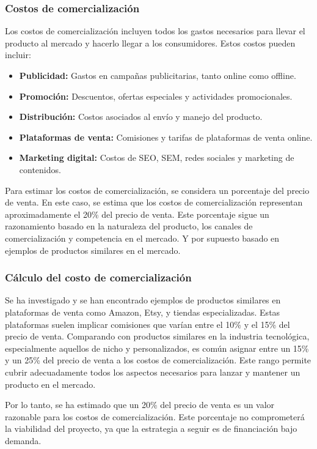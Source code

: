 \subsubsection{Costos de comercialización}

Los costos de comercialización incluyen todos los gastos necesarios para llevar el producto al mercado y hacerlo llegar a los consumidores. Estos costos pueden incluir:

\begin{itemize}
    \item \textbf{Publicidad:} Gastos en campañas publicitarias, tanto online como offline.
    \item \textbf{Promoción:} Descuentos, ofertas especiales y actividades promocionales.
    \item \textbf{Distribución:} Costos asociados al envío y manejo del producto.
    \item \textbf{Plataformas de venta:} Comisiones y tarifas de plataformas de venta online.
    \item \textbf{Marketing digital:} Costos de SEO, SEM, redes sociales y marketing de contenidos.
\end{itemize}

Para estimar los costos de comercialización, se considera un porcentaje del precio de venta. En este caso, se estima que los costos de comercialización representan aproximadamente el 20\% del precio de venta. Este porcentaje sigue un razonamiento basado en la naturaleza del producto, los canales de comercialización y competencia en el mercado. Y por supuesto basado en ejemplos de productos similares en el mercado.

\subsubsection{Cálculo del costo de comercialización}
Se ha investigado y se han encontrado ejemplos de productos similares en plataformas de venta como Amazon, Etsy, y tiendas especializadas. Estas plataformas suelen implicar comisiones que varían entre el 10\% y el 15\% del precio de venta. Comparando con productos similares en la industria tecnológica, especialmente aquellos de nicho y personalizados, es común asignar entre un 15\% y un 25\% del precio de venta a los costos de comercialización. Este rango permite cubrir adecuadamente todos los aspectos necesarios para lanzar y mantener un producto en el mercado.

Por lo tanto, se ha estimado que un 20\% del precio de venta es un valor razonable para los costos de comercialización. Este porcentaje no comprometerá la viabilidad del proyecto, ya que la estrategia a seguir es de financiación bajo demanda.


